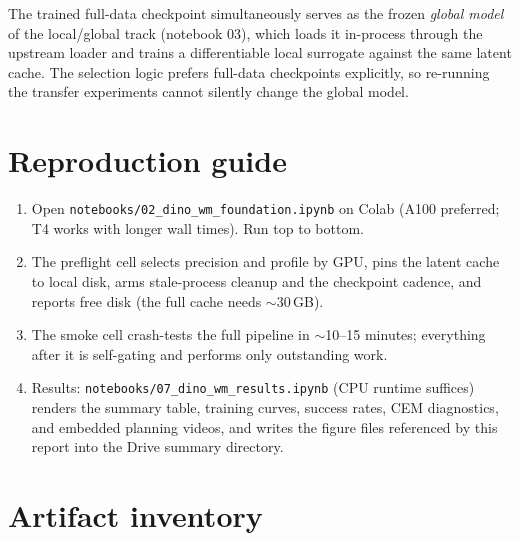 \documentclass[11pt]{article}
\begin{document}
The trained full-data checkpoint simultaneously serves as the frozen
\emph{global model} of the local/global track (notebook 03), which loads it
in-process through the upstream loader and trains a differentiable local
surrogate against the same latent cache. The selection logic prefers
full-data checkpoints explicitly, so re-running the transfer experiments
cannot silently change the global model.

\appendix

\section{Reproduction guide}

\begin{enumerate}
\item Open \texttt{notebooks/02\_dino\_wm\_foundation.ipynb} on Colab
      (A100 preferred; T4 works with longer wall times). Run top to bottom.
\item The preflight cell selects precision and profile by GPU, pins the
      latent cache to local disk, arms stale-process cleanup and the
      checkpoint cadence, and reports free disk (the full cache needs
      $\sim$30\,GB).
\item The smoke cell crash-tests the full pipeline in $\sim$10--15 minutes;
      everything after it is self-gating and performs only outstanding work.
\item Results: \texttt{notebooks/07\_dino\_wm\_results.ipynb} (CPU runtime
      suffices) renders the summary table, training curves, success rates,
      CEM diagnostics, and embedded planning videos, and writes the figure
      files referenced by this report into the Drive summary directory.
\end{enumerate}

\section{Artifact inventory}
\end{document}
